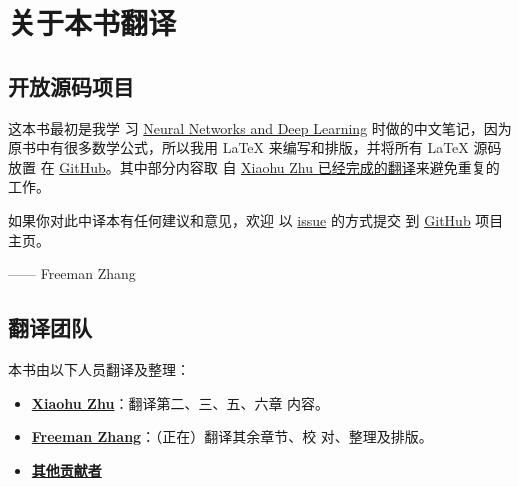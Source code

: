 
\chapter{关于本书翻译}
\label{ch:TranslationTeam}

\section*{开放源码项目}

这本书最初是我学
习 \href{http://neuralnetworksanddeeplearning.com/index.html}{Neural Networks
  and Deep Learning} 时做的中文笔记，因为原书中有很多数学公式，所以我用 \LaTeX{}
来编写和排版，并将所有 \LaTeX{} 源码放置
在 \href{https://github.com/zhanggyb/nndl}{GitHub}。其中部分内容取
自
\href{https://github.com/tigerneil/neural-networks-and-deep-learning-zh-cn}{Xiaohu
  Zhu 已经完成的翻译}来避免重复的工作。

如果你对此中译本有任何建议和意见，欢迎
以 \href{https://github.com/zhanggyb/nndl/issues}{issue} 的方式提交
到 \href{https://github.com/zhanggyb/nndl}{GitHub} 项目主页。

\begin{flushright}
  —— Freeman Zhang
\end{flushright}

\section*{翻译团队}
\label{sec:TranslationTeam}

本书由以下人员翻译及整理：

\begin{itemize}
\item \textbf{\href{mailto:xhzhu.nju@gmail}{Xiaohu Zhu}}：翻译第二、三、五、六章
  内容。
\item \textbf{\href{mailto:zhanggyb@gmail.com}{Freeman Zhang}}：（正在）翻译其余章节、校
  对、整理及排版。
\item \textbf{\href{https://github.com/zhanggyb/nndl/graphs/contributors}{其他贡献者}}
\end{itemize}
